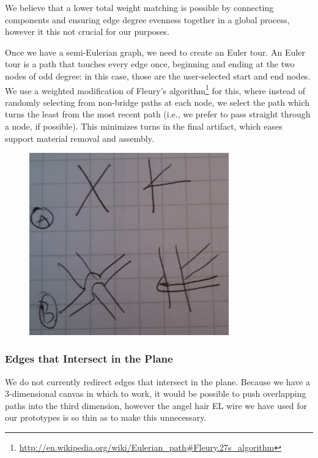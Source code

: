 We believe that a lower total weight matching is possible by connecting components and ensuring edge degree evenness together in a global process, however it this not crucial for our purposes.

Once we have a semi-Eulerian graph, we need to create an Euler tour.  An Euler tour is a path that touches every edge once, beginning and ending at the two nodes of odd degree: in this case, those are the user-selected start and end nodes.  We use a weighted modification of Fleury's algorithm\footnote{\url{http://en.wikipedia.org/wiki/Eulerian_path\#Fleury.27s_algorithm}} for this, where instead of randomly selecting from non-bridge paths at each node, we select the path which turns the least from the most recent path (i.e., we prefer to pass straight through a node, if possible).  This minimizes turns in the final artifact, which eases support material removal and assembly.

\begin{figure}[h!]
\centering
    \includegraphics[width=3.4in]{figures/placeholder/templates.jpg}
\caption{}
\label{fig:templates}
\end{figure}

\subsubsection{Edges that Intersect in the Plane}
We do not currently redirect edges that intersect in the plane.  Because we have a 3-dimensional canvas in which to work, it would be possible to push overlapping paths into the third dimension, however the angel hair EL wire we have used for our prototypes is so thin as to make this unnecessary.

